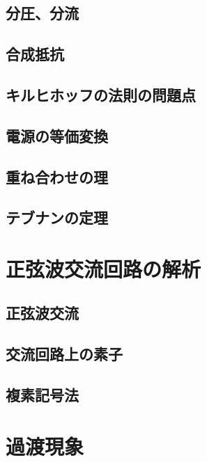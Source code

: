 \documentclass{ltjsreport}
\begin{document}
\subsection{分圧、分流}

\subsection{合成抵抗}

\subsection{キルヒホッフの法則の問題点}

\subsection{電源の等価変換}

\subsection{重ね合わせの理}

\subsection{テブナンの定理}















\section{正弦波交流回路の解析}

\subsection{正弦波交流}

\subsection{交流回路上の素子}

\subsection{複素記号法}


\section{過渡現象}
\end{document}
